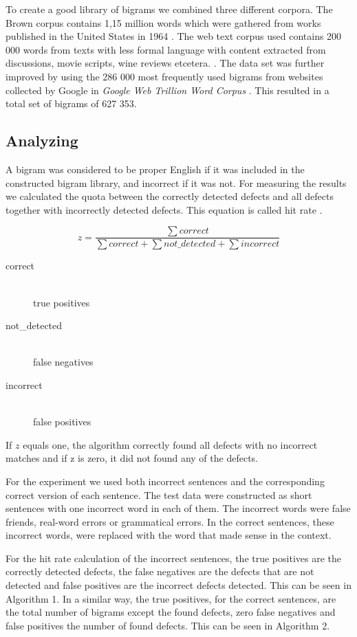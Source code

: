 \documentclass[a4paper,12pt]{article}
\begin{document}
To create a good library of bigrams we combined three different corpora.  The Brown corpus contains 1,15 million words which were gathered from works published in the United States in 1964 \cite{francis64brown}. The web text corpus used contains 200 000 words from texts with less formal language with content extracted from discussions, movie scripts, wine reviews etcetera. \cite{nltkWebtext}. The data set was further improved by using the 286 000 most frequently used bigrams from websites collected by Google in \emph{Google Web Trillion Word Corpus} \cite{google}.  This resulted in a total set of bigrams of 627 353. 

\subsection{Analyzing}
\label{ref:analyzing}
A bigram was considered to be proper English if it was included in the constructed bigram library, and incorrect if it was not. For measuring the results we calculated the quota between the correctly detected defects and all defects together with incorrectly detected defects. This equation is called hit rate \cite{ghayoomi2005word}.

$$z = \frac{\sum correct}{\sum correct + \sum not\_detected + \sum incorrect}$$
\begin{description}
  \item[correct] \hfill \\
  		true positives
  \item[not\_detected] \hfill \\
  		false negatives
  \item[incorrect] \hfill \\
   		false positives
\end{description}

If $z$ equals one, the algorithm correctly found all defects with no incorrect matches and if z is zero, it did not found any of the defects.

For the experiment we used both incorrect sentences and the corresponding correct version of each sentence. The test data were constructed as short sentences with one incorrect word in each of them. The incorrect words were false friends, real-word errors or grammatical errors. In the correct sentences, these incorrect words, were replaced with the word that made sense in the context. 

For the hit rate calculation of the incorrect sentences, the true positives are the correctly detected defects, the false negatives are the defects that are not detected and false positives are the incorrect defects detected. This can be seen in Algorithm 1. In a similar way, the true positives, for the correct sentences, are the total number of bigrams except the found defects, zero false negatives and false positives the number of found defects. This can be seen in Algorithm 2.
\end{document}
